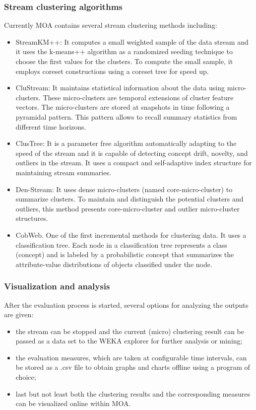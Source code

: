 \documentclass[a4paper,12pt,twoside]{book}
\begin{document}
\subsubsection{Stream clustering algorithms}
\label{sec:algos}

Currently MOA contains several stream clustering methods including:

\begin{itemize}
	\item StreamKM++: It computes a small weighted sample of the data stream
	 and it uses the k-means++ algorithm as a randomized seeding technique to choose the 
	 first values for the clusters. To compute the small sample, it employs coreset constructions
	 using a coreset tree for speed up. 
	\item CluStream: It maintains statistical information about the data using micro-clusters. These micro-clusters are temporal extensions of cluster feature vectors. The 
	micro-clusters are stored at snapshots in time following a pyramidal pattern. This pattern 
	allows to recall summary statistics from different time horizons. 
	\item ClusTree: It is a parameter free algorithm automatically adapting to the speed of the stream and it is capable of detecting concept drift, novelty, and outliers in the stream. It uses a compact and self-adaptive index structure for maintaining stream summaries.
	\item Den-Stream: It uses dense micro-clusters (named core-micro-cluster) 
	to summarize clusters. To maintain and distinguish the potential clusters and outliers, 
	this method presents core-micro-cluster and outlier micro-cluster structures.
	  \item CobWeb. One of the first incremental methods for clustering data. 
	  It uses a classification tree. Each node in a classification tree represents a class (concept)
	   and is labeled by a probabilistic concept that summarizes the attribute-value distributions
	    of objects classified under the node. 
\end{itemize}



\subsubsection{Visualization and analysis}
\label{sec:gui}

After the evaluation process is started, several options for analyzing the outputs are given:
\begin{itemize}
\item the stream can be stopped and the current (micro) clustering result can be passed as a data set to the WEKA explorer for further analysis or mining; 
\item the evaluation measures, which are taken at configurable time intervals, can be stored as a {.csv} file to obtain graphs and charts offline using a program of choice;
\item last but not least both the clustering results and the corresponding measures can be visualized online within MOA.\end{itemize}
\end{document}
